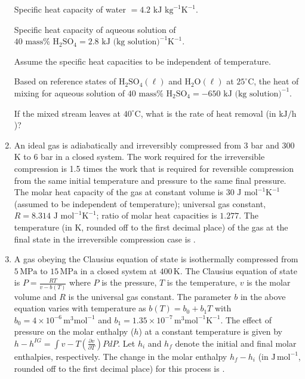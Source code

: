 \documentclass[journal,12pt,onecolumn]{IEEEtran}
\theoremstyle{remark}
\begin{document}
\begin{enumerate}
Specific heat capacity of water $= 4.2 \text{ kJ kg}^{-1} \text{K}^{-1}$.

Specific heat capacity of aqueous solution of $40 \text{ mass}\% \text{ H}_2\text{SO}_4 = 2.8 \text{ kJ (kg solution)}^{-1} \text{K}^{-1}$.

Assume the specific heat capacities to be independent of temperature.

Based on reference states of $\text{H}_2\text{SO}_4 (\ell)$ and $\text{H}_2\text{O} (\ell)$ at $25^\circ\text{C}$, the heat of mixing for aqueous solution of $40 \text{ mass}\% \text{ H}_2\text{SO}_4 = -650 \text{ kJ (kg solution)}^{-1}$.

If the mixed stream leaves at $40^\circ\text{C}$, what is the rate of heat removal (in $\text{kJ/h}$)?
\hfill{}
\begin{enumerate}
\end{enumerate}

\item An ideal gas is adiabatically and irreversibly compressed from 3 bar and 300 K to 6 bar in a closed system. The work required for the irreversible compression is 1.5 times the work that is required for reversible compression from the same initial temperature and pressure to the same final pressure. The molar heat capacity of the gas at constant volume is $30 \text{ J mol}^{-1} \text{K}^{-1}$ (assumed to be independent of temperature); universal gas constant, $R = 8.314 \text{ J mol}^{-1} \text{K}^{-1}$; ratio of molar heat capacities is $1.277$. The temperature (in K, rounded off to the first decimal place) of the gas at the final state in the irreversible compression case is \underline{\hspace{1cm}}.\hfill{}

\item A gas obeying the Clausius equation of state is isothermally compressed from $5 \, \text{MPa}$ to $15 \, \text{MPa}$ in a closed system at $400 \, \text{K}$. The Clausius equation of state is $P = \frac{RT}{v - b(T)}$ where $P$ is the pressure, $T$ is the temperature, $v$ is the molar volume and $R$ is the universal gas constant. The parameter $b$ in the above equation varies with temperature as $b(T) = b_0 + b_1 T$ with $b_0 = 4 \times 10^{-6} \, \text{m}^3 \text{mol}^{-1}$ and $b_1 = 1.35 \times 10^{-7} \, \text{m}^3 \text{mol}^{-1} \text{K}^{-1}$. The effect of pressure on the molar enthalpy ($h$) at a constant temperature is given by $h - h^{IG} = \int v - T \left( \frac{\partial v}{\partial T} \right)P dP$. Let $h_i$ and $h_f$ denote the initial and final molar enthalpies, respectively. The change in the molar enthalpy $h_f - h_i$ (in $\text{J} \, \text{mol}^{-1}$, rounded off to the first decimal place) for this process is \underline{\hspace{1cm}}.\hfill{}


\end{enumerate}
\end{document}
